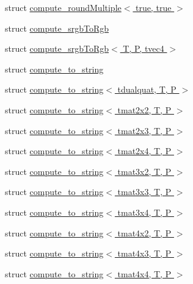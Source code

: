 \begin{DoxyCompactItemize}
\item 
struct \hyperlink{structglm_1_1detail_1_1compute__round_multiple_3_01true_00_01true_01_4}{compute\+\_\+round\+Multiple$<$ true, true $>$}
\item 
struct \hyperlink{structglm_1_1detail_1_1compute__srgb_to_rgb}{compute\+\_\+srgb\+To\+Rgb}
\item 
struct \hyperlink{structglm_1_1detail_1_1compute__srgb_to_rgb_3_01_t_00_01_p_00_01tvec4_01_4}{compute\+\_\+srgb\+To\+Rgb$<$ T, P, tvec4 $>$}
\item 
struct \hyperlink{structglm_1_1detail_1_1compute__to__string}{compute\+\_\+to\+\_\+string}
\item 
struct \hyperlink{structglm_1_1detail_1_1compute__to__string_3_01tdualquat_00_01_t_00_01_p_01_4}{compute\+\_\+to\+\_\+string$<$ tdualquat, T, P $>$}
\item 
struct \hyperlink{structglm_1_1detail_1_1compute__to__string_3_01tmat2x2_00_01_t_00_01_p_01_4}{compute\+\_\+to\+\_\+string$<$ tmat2x2, T, P $>$}
\item 
struct \hyperlink{structglm_1_1detail_1_1compute__to__string_3_01tmat2x3_00_01_t_00_01_p_01_4}{compute\+\_\+to\+\_\+string$<$ tmat2x3, T, P $>$}
\item 
struct \hyperlink{structglm_1_1detail_1_1compute__to__string_3_01tmat2x4_00_01_t_00_01_p_01_4}{compute\+\_\+to\+\_\+string$<$ tmat2x4, T, P $>$}
\item 
struct \hyperlink{structglm_1_1detail_1_1compute__to__string_3_01tmat3x2_00_01_t_00_01_p_01_4}{compute\+\_\+to\+\_\+string$<$ tmat3x2, T, P $>$}
\item 
struct \hyperlink{structglm_1_1detail_1_1compute__to__string_3_01tmat3x3_00_01_t_00_01_p_01_4}{compute\+\_\+to\+\_\+string$<$ tmat3x3, T, P $>$}
\item 
struct \hyperlink{structglm_1_1detail_1_1compute__to__string_3_01tmat3x4_00_01_t_00_01_p_01_4}{compute\+\_\+to\+\_\+string$<$ tmat3x4, T, P $>$}
\item 
struct \hyperlink{structglm_1_1detail_1_1compute__to__string_3_01tmat4x2_00_01_t_00_01_p_01_4}{compute\+\_\+to\+\_\+string$<$ tmat4x2, T, P $>$}
\item 
struct \hyperlink{structglm_1_1detail_1_1compute__to__string_3_01tmat4x3_00_01_t_00_01_p_01_4}{compute\+\_\+to\+\_\+string$<$ tmat4x3, T, P $>$}
\item 
struct \hyperlink{structglm_1_1detail_1_1compute__to__string_3_01tmat4x4_00_01_t_00_01_p_01_4}{compute\+\_\+to\+\_\+string$<$ tmat4x4, T, P $>$}
\item 

\end{DoxyCompactItemize}

